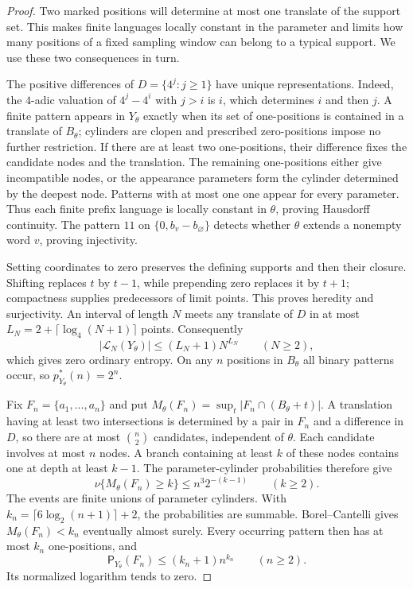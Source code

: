 \documentclass[11pt,reqno]{amsart}
\numberwithin{equation}{section}
\theoremstyle{definition}
\theoremstyle{definition}
\newcommand{\Patt}{\mathsf P}
\begin{document}
\begin{proof}
Two marked positions will determine at most one translate of the
support set. This makes finite languages locally constant in the
parameter and limits how many positions of a fixed sampling window
can belong to a typical support. We use these two consequences in
turn.

The positive differences of $D=\{4^j:j\ge1\}$ have unique
representations. Indeed, the $4$-adic valuation of
$4^j-4^i$ with $j>i$ is $i$, which determines $i$ and then $j$.
A finite pattern appears in $Y_\theta$ exactly when its set of
one-positions is contained in a translate of $B_\theta$;
cylinders are clopen and prescribed zero-positions impose no
further restriction. If there are at least two one-positions,
their difference fixes the candidate nodes and the translation.
The remaining one-positions either give incompatible nodes, or
the appearance parameters form the cylinder determined by the
deepest node. Patterns with at most one one appear for every
parameter. Thus each finite prefix language is locally constant
in $\theta$, proving Hausdorff continuity. The pattern $11$ on
$\{0,b_v-b_\varnothing\}$ detects whether $\theta$ extends a
nonempty word $v$, proving injectivity.

Setting coordinates to zero preserves the defining supports and
then their closure. Shifting replaces $t$ by $t-1$, while
prepending zero replaces it by $t+1$; compactness supplies
predecessors of limit points. This proves heredity and surjectivity.
An interval of length $N$ meets any translate of $D$ in at most
$L_N=2+\lceil\log_4(N+1)\rceil$ points. Consequently
\[
 |\mathcal L_N(Y_\theta)|
 \le (L_N+1)N^{L_N}\qquad(N\ge2),
\]
which gives zero ordinary entropy. On any $n$ positions in
$B_\theta$ all binary patterns occur, so $p_{Y_\theta}^*(n)=2^n$.

Fix $F_n=\{a_1,\ldots,a_n\}$ and put
$M_\theta(F_n)=\sup_t|F_n\cap(B_\theta+t)|$.
A translation having at least two intersections is determined
by a pair in $F_n$ and a difference in $D$, so there are at most
$\binom n2$ candidates, independent of $\theta$. Each candidate
involves at most $n$ nodes. A branch containing at least $k$
of these nodes contains one at depth at least $k-1$. The
parameter-cylinder probabilities therefore give
\[
 \nu\{M_\theta(F_n)\ge k\}\le n^3 2^{-(k-1)}
 \qquad(k\ge2).
\]
The events are finite unions of parameter cylinders. With
$k_n=\lceil6\log_2(n+1)\rceil+2$, the probabilities are summable.
Borel--Cantelli gives $M_\theta(F_n)<k_n$ eventually almost surely.
Every occurring pattern then has at most $k_n$ one-positions, and
\[
 \Patt_{Y_\theta}(F_n)\le(k_n+1)n^{k_n}\qquad(n\ge2).
\]
Its normalized logarithm tends to zero.
\end{proof}
\end{document}
